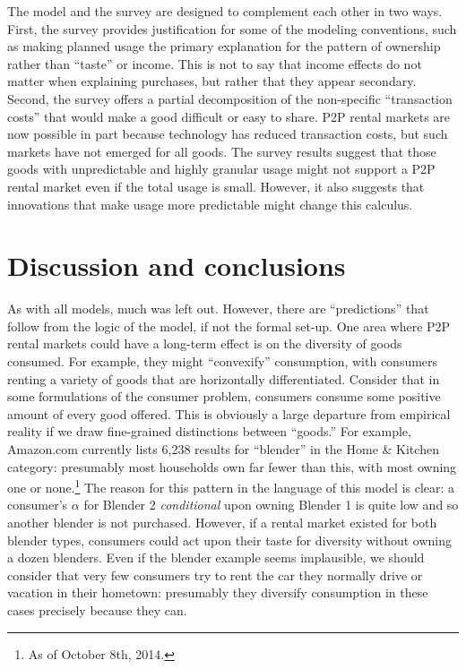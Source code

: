 \documentclass[11pt]{article}
\begin{document}
The model and the survey are designed to complement each other in two ways. 
First, the survey provides justification for some of the modeling conventions, such as making planned usage the primary explanation for the pattern of ownership rather than ``taste'' or income. 
This is not to say that income effects do not matter when explaining purchases, but rather that they appear secondary.
Second, the survey offers a partial decomposition of the non-specific ``transaction costs'' that would make a good difficult or easy to share.  
P2P rental markets are now possible in part because technology has reduced transaction costs, but such markets have not emerged for all goods. 
The survey results suggest that those goods with unpredictable and highly granular usage might not support a P2P rental market even if the total usage is small. 
However, it also suggests that innovations that make usage more predictable might change this calculus. 

\section{Discussion and conclusions} 

As with all models, much was left out. 
However, there are ``predictions'' that follow from the logic of the model, if not the formal set-up. 
One area where P2P rental markets could have a long-term effect is on the diversity of goods consumed. 
For example, they might ``convexify'' consumption, with consumers renting a variety of goods that are horizontally differentiated.   
Consider that in some formulations of the consumer problem, consumers consume some positive amount of every good offered.
This is obviously a large departure from empirical reality if we draw fine-grained distinctions between ``goods.'' 
For example, Amazon.com currently lists 6,238 results for ``blender'' in the Home \& Kitchen category: 
presumably most households own far fewer than this, with most owning one or none.\footnote{As of October 8th, 2014.}
The reason for this pattern in the language of this model is clear: 
a consumer's $\alpha$ for Blender 2 \emph{conditional} upon owning Blender 1 is quite low and so another blender is not purchased.
However, if a rental market existed for both blender types, consumers could act upon their taste for diversity without owning a dozen blenders. 
Even if the blender example seems implausible, we should consider that very few consumers try to rent the car they normally drive or vacation in their hometown: presumably they diversify consumption in these cases precisely because they can. 
\end{document}
